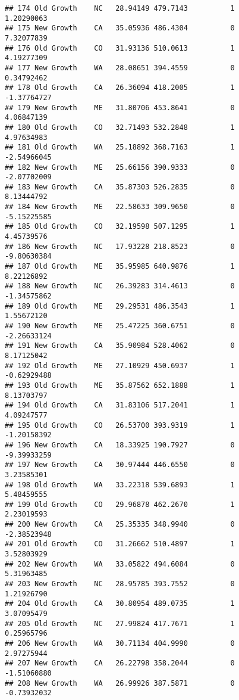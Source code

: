 \documentclass[
]{article}
\begin{document}
\begin{verbatim}
## 174 Old Growth    NC   28.94149 479.7143          1          1.20290063
## 175 New Growth    CA   35.05936 486.4304          0          7.32077839
## 176 Old Growth    CO   31.93136 510.0613          1          4.19277309
## 177 New Growth    WA   28.08651 394.4559          0          0.34792462
## 178 Old Growth    CA   26.36094 418.2005          1         -1.37764727
## 179 New Growth    ME   31.80706 453.8641          0          4.06847139
## 180 Old Growth    CO   32.71493 532.2848          1          4.97634983
## 181 Old Growth    WA   25.18892 368.7163          1         -2.54966045
## 182 New Growth    ME   25.66156 390.9333          0         -2.07702009
## 183 New Growth    CA   35.87303 526.2835          0          8.13444792
## 184 New Growth    ME   22.58633 309.9650          0         -5.15225585
## 185 Old Growth    CO   32.19598 507.1295          1          4.45739576
## 186 New Growth    NC   17.93228 218.8523          0         -9.80630384
## 187 Old Growth    ME   35.95985 640.9876          1          8.22126892
## 188 New Growth    NC   26.39283 314.4613          0         -1.34575862
## 189 Old Growth    ME   29.29531 486.3543          1          1.55672120
## 190 New Growth    ME   25.47225 360.6751          0         -2.26633124
## 191 New Growth    CA   35.90984 528.4062          0          8.17125042
## 192 Old Growth    ME   27.10929 450.6937          1         -0.62929488
## 193 Old Growth    ME   35.87562 652.1888          1          8.13703797
## 194 Old Growth    CA   31.83106 517.2041          1          4.09247577
## 195 Old Growth    CO   26.53700 393.9319          1         -1.20158392
## 196 New Growth    CA   18.33925 190.7927          0         -9.39933259
## 197 New Growth    CA   30.97444 446.6550          0          3.23585301
## 198 Old Growth    WA   33.22318 539.6893          1          5.48459555
## 199 Old Growth    CO   29.96878 462.2670          1          2.23019593
## 200 New Growth    CA   25.35335 348.9940          0         -2.38523948
## 201 Old Growth    CO   31.26662 510.4897          1          3.52803929
## 202 New Growth    WA   33.05822 494.6084          0          5.31963485
## 203 New Growth    NC   28.95785 393.7552          0          1.21926790
## 204 Old Growth    CA   30.80954 489.0735          1          3.07095479
## 205 Old Growth    NC   27.99824 417.7671          1          0.25965796
## 206 New Growth    WA   30.71134 404.9990          0          2.97275944
## 207 New Growth    CA   26.22798 358.2044          0         -1.51060880
## 208 New Growth    WA   26.99926 387.5871          0         -0.73932032

\end{verbatim}
\end{document}
